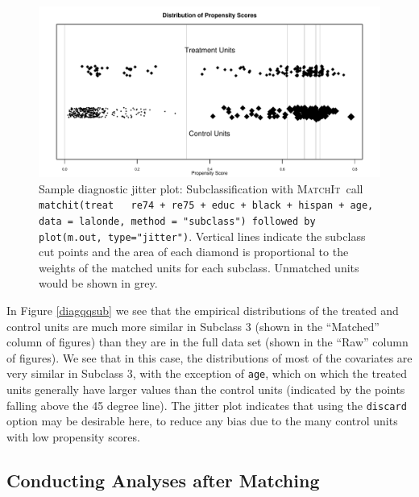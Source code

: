 \documentclass[oneside,letterpaper,titlepage]{article}
\newcommand{\MatchIt}{\textsc{MatchIt}}
\begin{document}
\begin{enumerate}
\begin{figure}[tbp]
  \begin{center}
    \includegraphics[scale=0.5]{figs/jitterplotsub}
    \hfill
    \caption{Sample diagnostic jitter plot: Subclassification with
      \MatchIt\ call \texttt{matchit(treat ~ re74 + re75 + educ +
        black + hispan + age, data = lalonde, method = "subclass")
        followed by plot(m.out, type="jitter")}.  Vertical lines
      indicate the subclass cut points and the area of each diamond is
      proportional to the weights of the matched units for each
      subclass.  Unmatched units would be shown in grey.}
    \label{diagjittersub}
  \end{center}
\end{figure}

In Figure \ref{diagqqsub} we see that the empirical distributions of
the treated and control units are much more similar in Subclass 3
(shown in the ``Matched'' column of figures) than they are in the full
data set (shown in the ``Raw'' column of figures).  We see that in
this case, the distributions of most of the covariates are very
similar in Subclass 3, with the exception of \texttt{age}, which on
which the treated units generally have larger values than the control
units (indicated by the points falling above the 45 degree line).  The
jitter plot indicates that using the \texttt{discard} option may be
desirable here, to reduce any bias due to the many control units with
low propensity scores.

\end{enumerate}

\subsection{Conducting Analyses after Matching}
\label{subsec:analysis}
\end{document}
